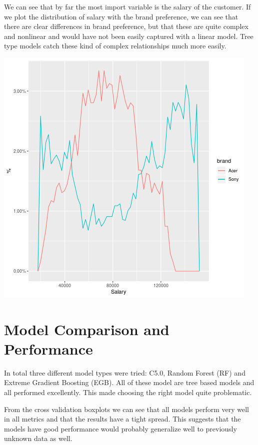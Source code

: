 \documentclass[12pt,a4paper,leqno]{report}
\theoremstyle{plain}
\theoremstyle{definition}
\theoremstyle{remark}
\begin{document}
We can see that by far the most import variable is the salary of the customer. If we plot the distribution
of salary with the brand preference, we can see that there are clear differences in brand preference, but that these
are quite complex and nonlinear and would have not been easily captured with a linear model. Tree
type models catch these kind of complex relationships much more easily.

\bigskip
{
    \centering
    \includegraphics[width=\textwidth,height=\textheight,keepaspectratio]{brand_salary_distribution.png}
    \par
}
\bigskip


\section{Model Comparison and Performance}

In total three different model types were tried: C5.0, Random Forest (RF) and Extreme Gradient Boosting (EGB).
All of these model are tree based models and all performed excellently. This made choosing the right model
quite problematic.

From the cross validation boxplots we can see that all models perform very well in all metrics and that
the results have a tight spread. This suggests that the models have good performance would probably
generalize well to previously unknown data as well.
\end{document}
